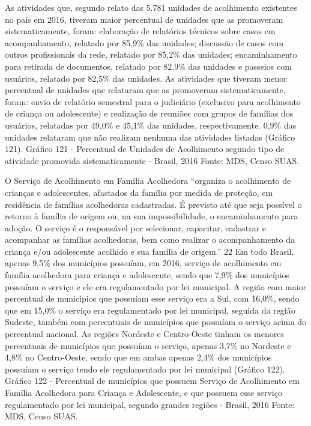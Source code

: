 \documentclass[
  brazilian]{report}
\begin{document}
As atividades que, segundo relato das 5.781 unidades de acolhimento
existentes no país em 2016, tiveram maior percentual de unidades que as
promoveram sistematicamente, foram: elaboração de relatórios técnicos
sobre casos em acompanhamento, relatado por 85,9\% das unidades;
discussão de casos com outros profissionais da rede, relatado por 85,2\%
das unidades; encaminhamento para retirada de documentos, relatado por
82,9\% das unidades e passeios com usuários, relatado por 82,5\% das
unidades. As atividades que tiveram menor percentual de unidades que
relataram que as promoveram sistematicamente, foram: envio de relatório
semestral para o judiciário (exclusivo para acolhimento de criança ou
adolescente) e realização de reuniões com grupos de famílias dos
usuários, relatadas por 49,0\% e 45,1\% das unidades, respectivamente.
0,9\% das unidades relataram que não realizam nenhuma das atividades
listadas (Gráfico 121). Gráfico 121 - Percentual de Unidades de
Acolhimento segundo tipo de atividade promovida sistematicamente -
Brasil, 2016 Fonte: MDS, Censo SUAS.

O Serviço de Acolhimento em Família Acolhedora ``organiza o acolhimento
de crianças e adolescentes, afastados da família por medida de proteção,
em residência de famílias acolhedoras cadastradas. É previsto até que
seja possível o retorno à família de origem ou, na sua impossibilidade,
o encaminhamento para adoção. O serviço é o responsável por selecionar,
capacitar, cadastrar e acompanhar as famílias acolhedoras, bem como
realizar o acompanhamento da criança e/ou adolescente acolhido e sua
família de origem.'' 22 Em todo Brasil, apenas 9,5\% dos municípios
possuíam, em 2016, serviço de acolhimento em família acolhedora para
criança e adolescente, sendo que 7,9\% dos municípios possuíam o serviço
e ele era regulamentado por lei municipal. A região com maior percentual
de municípios que possuíam esse serviço era a Sul, com 16,0\%, sendo que
em 15,0\% o serviço era regulamentado por lei municipal, seguida da
região Sudeste, também com percentuais de municípios que possuíam o
serviço acima do percentual nacional. As regiões Nordeste e Centro-Oeste
tinham os menores percentuais de municípios que possuíam o serviço,
apenas 3,7\% no Nordeste e 4,8\% no Centro-Oeste, sendo que em ambas
apenas 2,4\% dos municípios possuíam o serviço tendo ele regulamentado
por lei municipal (Gráfico 122). Gráfico 122 - Percentual de municípios
que possuem Serviço de Acolhimento em Família Acolhedora para Criança e
Adolescente, e que possuem esse serviço regulamentado por lei municipal,
segundo grandes regiões - Brasil, 2016 Fonte: MDS, Censo SUAS.
\end{document}
